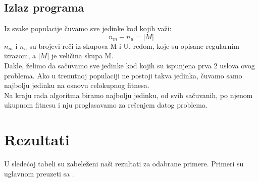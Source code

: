 \documentclass{article}
\begin{document}
\subsection{Izlaz programa}
Iz svake populacije čuvamo sve jedinke kod kojih važi:
$$n_m - n_u = |M|$$
$n_m$ i $n_u$ su brojevi reči iz skupova M i U, redom, koje su opisane regularnim izrazom, a $|M|$ je veličina skupa M. \\
Dakle, želimo da sačuvamo sve jedinke kod kojih su ispunjena prva 2 uslova ovog problema. Ako u trenutnoj populaciji ne postoji takva jedinka, čuvamo samo najbolju jedinku na osnovu celokupnog fitnesa. \\
Na kraju rada algoritma biramo najbolju jedinku, od svih sačuvanih, po njenom ukupnom fitnesu i nju proglasavamo za rešenjem datog problema.

\section{Rezultati}
U sledećoj tabeli su zabeleženi naši rezultati za odabrane primere. Primeri su uglavnom preuzeti sa \cite{Examples}. 
\end{document}
